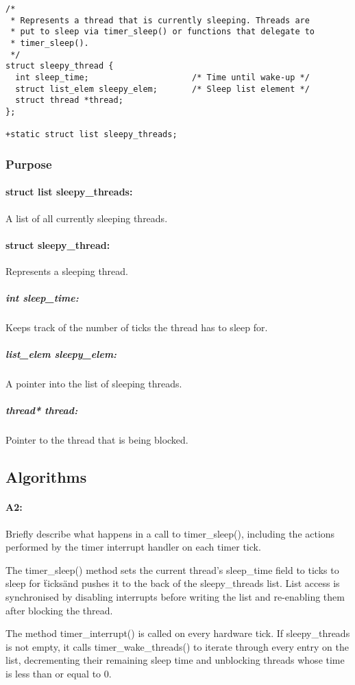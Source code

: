 \documentclass[11pt]{article}
\begin{document}
\begin{verbatim}
/*
 * Represents a thread that is currently sleeping. Threads are
 * put to sleep via timer_sleep() or functions that delegate to
 * timer_sleep().
 */
struct sleepy_thread {
  int sleep_time;                     /* Time until wake-up */
  struct list_elem sleepy_elem;       /* Sleep list element */
  struct thread *thread;
};

+static struct list sleepy_threads;
\end{verbatim}

\subsubsection{Purpose}
\paragraph{struct list sleepy\_threads:}
A list of all currently sleeping threads.

\paragraph{struct sleepy\_thread:}
Represents a sleeping thread.

\subparagraph{int sleep\_time:}
Keeps track of the number of ticks the thread has to sleep for.
\subparagraph{list\_elem sleepy\_elem:}
A pointer into the list of sleeping threads.
\subparagraph{thread* thread:}
Pointer to the thread that is being blocked.

\subsection{Algorithms}
\paragraph{A2:}
Briefly describe what happens in a call to timer\_sleep(), including the actions
performed by the timer interrupt handler on each timer tick.

The timer\_sleep() method sets the current thread's sleep\_time field to ticks
to sleep for \"ticks\" and pushes it to the back of the sleepy\_threads
list. List access is synchronised by disabling interrupts before writing the
list and re-enabling them after blocking the thread.

The method timer\_interrupt() is called on every hardware tick. If
sleepy\_threads is not empty, it calls timer\_wake\_threads() to iterate through
every entry on the list, decrementing their remaining sleep time and unblocking
threads whose time is less than or equal to 0.
\end{document}
